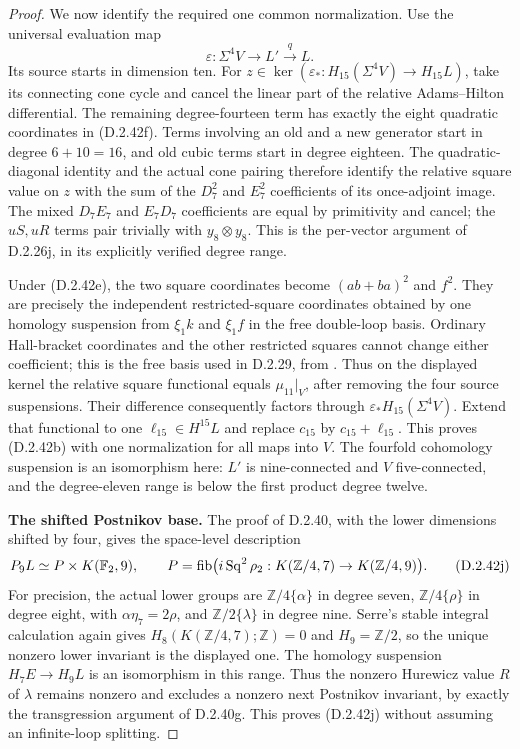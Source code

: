 \begin{proof}
We now identify the required one common normalization.  Use
the universal evaluation map
\[
 \varepsilon:\Sigma^4V\longrightarrow L'\xrightarrow{q}L.
 \tag{D.2.42i}
\]
Its source starts in dimension ten.  For
$z\in\ker(\varepsilon_*:H_{15}(\Sigma^4V)\to H_{15}L)$,
take its connecting cone cycle and cancel the linear part of
the relative Adams--Hilton differential.  The remaining
degree-fourteen term has exactly the eight quadratic coordinates
in \textup{(D.2.42f)}.  Terms involving an old and a new
generator start in degree $6+10=16$, and old cubic terms
start in degree eighteen.  The quadratic-diagonal identity and
the actual cone pairing therefore identify the relative square
value on $z$ with the sum of the $D_7^2$ and $E_7^2$
coefficients of its once-adjoint image.  The mixed $D_7E_7$
and $E_7D_7$ coefficients are equal by primitivity and cancel;
the $uS,uR$ terms pair trivially with $y_8\otimes y_8$.
This is the per-vector argument of D.2.26j, in its explicitly
verified degree range.

Under \textup{(D.2.42e)}, the two square coordinates become
$(ab+ba)^2$ and $f^2$.  They are precisely the independent
restricted-square coordinates obtained by one homology
suspension from $\xi_1k$ and $\xi_1f$ in the free double-loop
basis.  Ordinary Hall-bracket coordinates and the other
restricted squares cannot change either coefficient; this is
the free basis used in D.2.29, from
\cite[Chapter~III, Theorems~1.2--1.4 and~3.1--3.2]{I_CohenLadaMay1976}.
Thus on the displayed kernel the relative square functional
equals $\mu_{11}|_V$, after removing the four source
suspensions.  Their difference consequently factors through
$\varepsilon_*H_{15}(\Sigma^4V)$.  Extend that functional to
one $\ell_{15}\in H^{15}L$ and replace $c_{15}$ by
$c_{15}+\ell_{15}$.  This proves \textup{(D.2.42b)} with
one normalization for all maps into $V$.
The fourfold cohomology suspension is an isomorphism here:
$L'$ is nine-connected and $V$ five-connected, and the
degree-eleven range is below the first product degree twelve.

\medskip\noindent
\textbf{The shifted Postnikov base.}
The proof of D.2.40, with the lower dimensions shifted by four,
gives the space-level description
\[
 P_9L\simeq P\times K(\mathbb F_2,9),\qquad
 P=\operatorname{fib}\bigl(i\operatorname{Sq}^2\rho_2:
              K(\mathbb Z/4,7)\to K(\mathbb Z/4,9)\bigr).
 \tag{D.2.42j}
\]
For precision, the actual lower groups are
$\mathbb Z/4\{\alpha\}$ in degree seven,
$\mathbb Z/4\{\rho\}$ in degree eight, with
$\alpha\eta_7=2\rho$, and $\mathbb Z/2\{\lambda\}$
in degree nine.  Serre's stable integral calculation again
gives $H_8(K(\mathbb Z/4,7);\mathbb Z)=0$ and $H_9=\mathbb Z/2$,
so the unique nonzero lower invariant is the displayed one.
The homology suspension $H_7E\to H_9L$ is an isomorphism
in this range.  Thus the nonzero Hurewicz value $R$ of
$\lambda$ remains nonzero and excludes a nonzero next
Postnikov invariant, by exactly the transgression argument
of D.2.40g.  This proves \textup{(D.2.42j)} without assuming
an infinite-loop splitting.


\end{proof}
